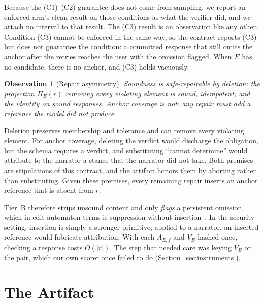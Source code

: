\documentclass[journal]{IEEEtran}
\newtheorem{observation}{Observation}
\begin{document}
Because the (C1)--(C2) guarantee does not come from sampling, we report an
enforced arm's clean result on those conditions as what the verifier did, and
we attach no interval to that result. The (C3) result is an observation like
any other. Condition (C3) cannot be enforced in the same way, so the contract
reports (C3) but does not guarantee the condition: a committed response that still omits
the anchor after the retries reaches the user with the omission flagged. When
$E$ has no candidate, there is no anchor, and (C3) holds vacuously.

\begin{observation}[Repair asymmetry]\label{prop:asym}
Soundness is safe-repairable by deletion: the projection $\Pi_E(r)$ removing
every violating element is sound, idempotent, and the identity on sound
responses. Anchor coverage is not: any repair must add a reference the model
did not produce.
\end{observation}

\begin{IEEEproof}
Deletion preserves membership and tolerance and can remove every violating
element. For anchor coverage, deleting the verdict would discharge the
obligation, but the schema requires a verdict, and substituting ``cannot
determine'' would attribute to the narrator a stance that the narrator did not
take. Both premises are stipulations of this contract, and the artifact honors
them by aborting rather than substituting. Given these premises, every
remaining repair inserts an anchor reference that is absent from $r$.
\end{IEEEproof}

Tier~B therefore strips unsound content and only \emph{flags} a persistent
omission, which in edit-automaton terms is suppression without
insertion~\cite{ligatti2005edit}. In the security setting, insertion is simply
a stronger primitive; applied to a narrator, an inserted reference would
fabricate attribution. With each $A_{E,f}$ and $V_E$ hashed once, checking a
response costs $O(|r|)$. The step that needed care was keying $V_E$ on the
pair, which our own scorer once failed to do (Section~\ref{sec:instruments}).

\section{The Artifact}\label{sec:contract}
\end{document}
